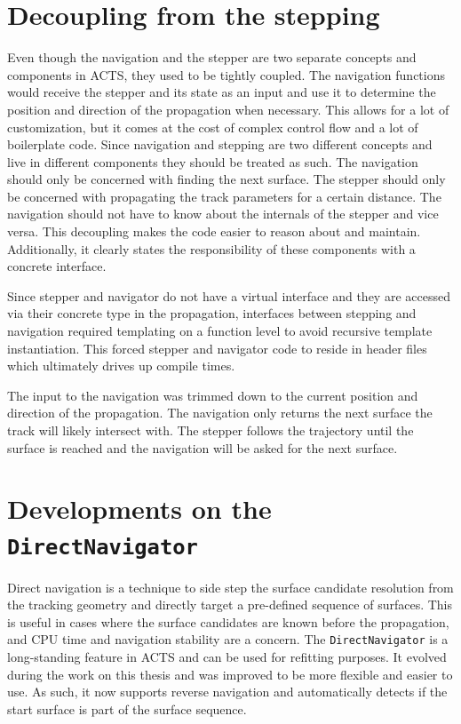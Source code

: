 \section{Decoupling from the stepping}

Even though the navigation and the stepper are two separate concepts and components in ACTS, they used to be tightly coupled. The navigation functions would receive the stepper and its state as an input and use it to determine the position and direction of the propagation when necessary. This allows for a lot of customization, but it comes at the cost of complex control flow and a lot of boilerplate code. Since navigation and stepping are two different concepts and live in different components they should be treated as such. The navigation should only be concerned with finding the next surface. The stepper should only be concerned with propagating the track parameters for a certain distance. The navigation should not have to know about the internals of the stepper and vice versa. This decoupling makes the code easier to reason about and maintain. Additionally, it clearly states the responsibility of these components with a concrete interface.

Since stepper and navigator do not have a virtual interface and they are accessed via their concrete type in the propagation, interfaces between stepping and navigation required templating on a function level to avoid recursive template instantiation. This forced stepper and navigator code to reside in header files which ultimately drives up compile times.

The input to the navigation was trimmed down to the current position and direction of the propagation. The navigation only returns the next surface the track will likely intersect with. The stepper follows the trajectory until the surface is reached and the navigation will be asked for the next surface.

\section{Developments on the \texttt{DirectNavigator}}

Direct navigation is a technique to side step the surface candidate resolution from the tracking geometry and directly target a pre-defined sequence of surfaces. This is useful in cases where the surface candidates are known before the propagation, and CPU time and navigation stability are a concern. The \texttt{DirectNavigator} is a long-standing feature in ACTS and can be used for refitting purposes. It evolved during the work on this thesis and was improved to be more flexible and easier to use. As such, it now supports reverse navigation and automatically detects if the start surface is part of the surface sequence.

